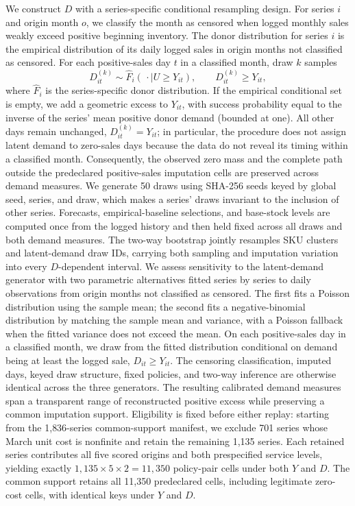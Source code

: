 \documentclass[msom,dblanonrev]{informs4}
\begin{document}
We construct $D$ with a series-specific conditional resampling design.
For series $i$ and origin month $o$, we classify the month as censored when logged monthly sales weakly exceed positive beginning inventory.
The donor distribution for series $i$ is the empirical distribution of its daily logged sales in origin months not classified as censored.
For each positive-sales day $t$ in a classified month, draw $k$ samples
\[
 D^{(k)}_{it}\sim \widehat F_i\!\left(\,\cdot\mid U\geq Y_{it}\right),
 \qquad D^{(k)}_{it}\geq Y_{it},
\]
where $\widehat F_i$ is the series-specific donor distribution.
If the empirical conditional set is empty, we add a geometric excess to $Y_{it}$, with success probability equal to the inverse of the series' mean positive donor demand (bounded at one).
All other days remain unchanged, $D^{(k)}_{it}=Y_{it}$; in particular, the procedure does not assign latent demand to zero-sales days because the data do not reveal its timing within a classified month.
Consequently, the observed zero mass and the complete path outside the predeclared positive-sales imputation cells are preserved across demand measures.
We generate 50 draws using SHA-256 seeds keyed by global seed, series, and draw, which makes a series' draws invariant to the inclusion of other series.
Forecasts, empirical-baseline selections, and base-stock levels are computed once from the logged history and then held fixed across all draws and both demand measures.
The two-way bootstrap jointly resamples SKU clusters and latent-demand draw IDs, carrying both sampling and imputation variation into every $D$-dependent interval.
We assess sensitivity to the latent-demand generator with two parametric alternatives fitted series by series to daily observations from origin months not classified as censored.
The first fits a Poisson distribution using the sample mean; the second fits a negative-binomial distribution by matching the sample mean and variance, with a Poisson fallback when the fitted variance does not exceed the mean.
On each positive-sales day in a classified month, we draw from the fitted distribution conditional on demand being at least the logged sale, $D_{it}\geq Y_{it}$.
The censoring classification, imputed days, keyed draw structure, fixed policies, and two-way inference are otherwise identical across the three generators.
The resulting calibrated demand measures span a transparent range of reconstructed positive excess while preserving a common imputation support.
Eligibility is fixed before either replay: starting from the 1{,}836-series common-support manifest, we exclude 701 series whose March unit cost is nonfinite and retain the remaining 1{,}135 series.
Each retained series contributes all five scored origins and both prespecified service levels, yielding exactly $1{,}135\times5\times2=11{,}350$ policy-pair cells under both $Y$ and $D$.
The common support retains all 11{,}350 predeclared cells, including legitimate zero-cost cells, with identical keys under $Y$ and $D$.
\end{document}
